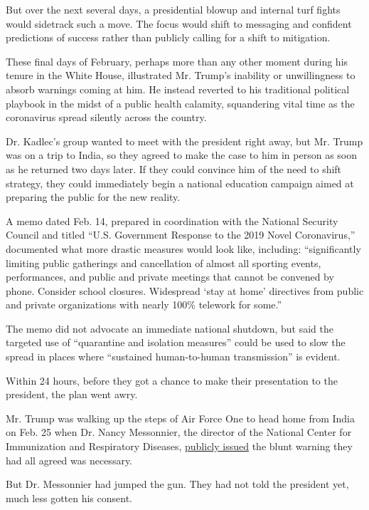 But over the next several days, a presidential blowup and internal turf
fights would sidetrack such a move. The focus would shift to messaging
and confident predictions of success rather than publicly calling for a
shift to mitigation.

These final days of February, perhaps more than any other moment during
his tenure in the White House, illustrated Mr. Trump's inability or
unwillingness to absorb warnings coming at him. He instead reverted to
his traditional political playbook in the midst of a public health
calamity, squandering vital time as the coronavirus spread silently
across the country.

Dr. Kadlec's group wanted to meet with the president right away, but Mr.
Trump was on a trip to India, so they agreed to make the case to him in
person as soon as he returned two days later. If they could convince him
of the need to shift strategy, they could immediately begin a national
education campaign aimed at preparing the public for the new reality.

A memo dated Feb. 14, prepared in coordination with the National
Security Council and titled ``U.S. Government Response to the 2019 Novel
Coronavirus,'' documented what more drastic measures would look like,
including: ``significantly limiting public gatherings and cancellation
of almost all sporting events, performances, and public and private
meetings that cannot be convened by phone. Consider school closures.
Widespread `stay at home' directives from public and private
organizations with nearly 100\% telework for some.''

The memo did not advocate an immediate national shutdown, but said the
targeted use of ``quarantine and isolation measures'' could be used to
slow the spread in places where ``sustained human-to-human
transmission'' is evident.

Within 24 hours, before they got a chance to make their presentation to
the president, the plan went awry.

Mr. Trump was walking up the steps of Air Force One to head home from
India on Feb. 25 when Dr. Nancy Messonnier, the director of the National
Center for Immunization and Respiratory Diseases,
\href{https://www.cdc.gov/media/releases/2020/t0225-cdc-telebriefing-covid-19.html}{publicly
issued} the blunt warning they had all agreed was necessary.

But Dr. Messonnier had jumped the gun. They had not told the president
yet, much less gotten his consent.

